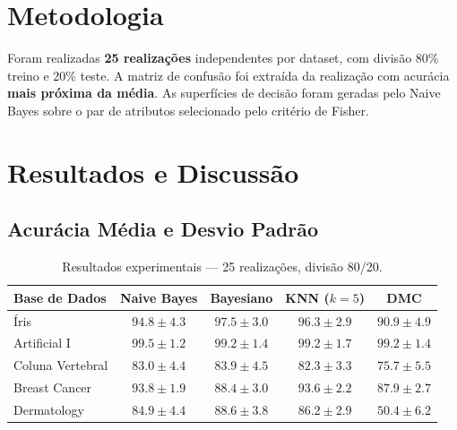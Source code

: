 \documentclass[12pt, a4paper]{article}
\begin{document}
\section{Metodologia}

Foram realizadas \textbf{25 realizações} independentes por dataset,
com divisão 80\% treino e 20\% teste. A matriz de confusão foi
extraída da realização com acurácia \textbf{mais próxima da média}.
As superfícies de decisão foram geradas pelo Naive Bayes sobre o
par de atributos selecionado pelo critério de Fisher.

\section{Resultados e Discussão}

\subsection{Acurácia Média e Desvio Padrão}

\begin{table}[H]
    \centering
    \caption{Resultados experimentais --- 25 realizações, divisão 80/20.}
    \label{tab:results}
    \begin{tabular}{@{}lcccc@{}}
        \toprule
        \textbf{Base de Dados} & \textbf{Naive Bayes} & \textbf{Bayesiano} & \textbf{KNN ($k=5$)} & \textbf{DMC} \\
        \midrule
        Íris             & $94.8 \pm 4.3$ & $97.5 \pm 3.0$ & $96.3 \pm 2.9$ & $90.9 \pm 4.9$ \\
        Artificial I     & $99.5 \pm 1.2$ & $99.2 \pm 1.4$ & $99.2 \pm 1.7$ & $99.2 \pm 1.4$ \\
        Coluna Vertebral & $83.0 \pm 4.4$ & $83.9 \pm 4.5$ & $82.3 \pm 3.3$ & $75.7 \pm 5.5$ \\
        Breast Cancer    & $93.8 \pm 1.9$ & $88.4 \pm 3.0$ & $93.6 \pm 2.2$ & $87.9 \pm 2.7$ \\
        Dermatology      & $84.9 \pm 4.4$ & $88.6 \pm 3.8$ & $86.2 \pm 2.9$ & $50.4 \pm 6.2$ \\
        \bottomrule
    \end{tabular}
\end{table}
\end{document}
